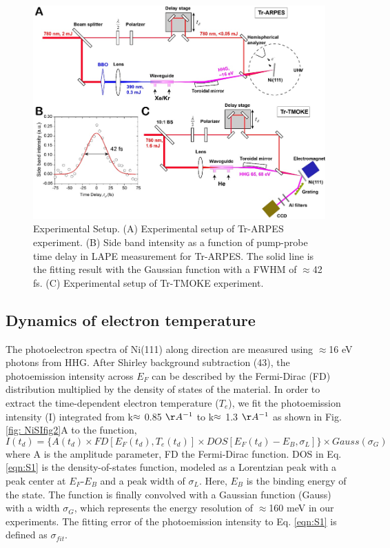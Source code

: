 \begin{figure}[htbp]
	\begin{center}
		\includegraphics[width=150mm]{figs/NiFigS1}
	\end{center}
	\caption{Experimental Setup. (A) Experimental setup of Tr-ARPES experiment. (B) Side band intensity as a function of pump-probe time delay in LAPE measurement for Tr-ARPES. The solid line is the fitting result with the Gaussian function with a FWHM of $\approx$42 fs. (C) Experimental setup of Tr-TMOKE experiment.}
	\label{fig: NiSIfig1}
\end{figure}

\subsection{Dynamics of electron temperature}
The photoelectron spectra of Ni(111) along  direction are measured using $\approx$16 eV photons from HHG. After Shirley background subtraction (43), the photoemission intensity across $E_{F}$ can be described by the Fermi-Dirac (FD) distribution multiplied by the density of states of the material. In order to extract the time-dependent electron temperature ($T_e$), we fit the photoemission intensity (I) integrated from k$\/\/ \approx$ 0.85 $\AA^{-1}$  to k$\/\/ \approx$ 1.3 $\AA^{-1}$ as shown in Fig. \ref{fig: NiSIfig2}A to the function,
\begin{equation}
I(t_{d})=\{A(t_d)\times FD[E_F(t_d),T_e(t_d)]\times DOS[E_F(t_d)-E_B,\sigma_L]\}\times\textit{Gauss}(\sigma_G)
\label{eqn:S1}
\end{equation}
where A is the amplitude parameter, FD the Fermi-Dirac function. DOS in Eq. \ref{eqn:S1} is the density-of-states function, modeled as a Lorentzian peak with a peak center at $E_F$-$E_B$ and a peak width of $\sigma_L$. Here, $E_B$ is the binding energy of the state. The function is finally convolved with a Gaussian function (Gauss) with a width $\sigma_G$, which represents the energy resolution of $\approx$160 meV in our experiments. The fitting error of the photoemission intensity to Eq. \ref{eqn:S1} is defined as $\sigma_{fit}$.

